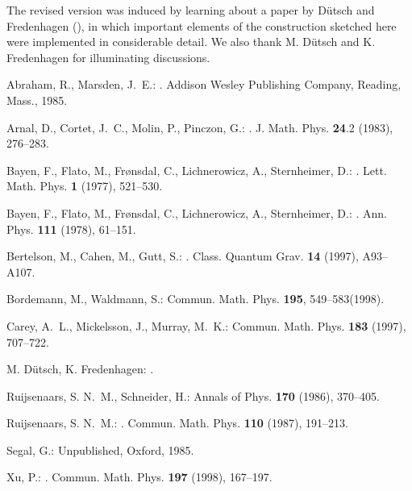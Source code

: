 \documentclass[a4paper,12pt]{article}
\begin{document}
The revised version was induced by learning about a paper by D\"utsch
and Fredenhagen (\cite{DF00}), in which important elements of 
the construction sketched here were
implemented in considerable detail. We also thank M. D\"utsch and 
K. Fredenhagen for
illuminating discussions.

\begin{thebibliography}{**}

{\sc Abraham, R., Marsden, J.~E.: }.
\newblock Addison Wesley Publishing Company, Reading, Mass., 1985.
 
{\sc Arnal, D., Cortet, J.~C., Molin, P., Pinczon, G.: }.
\newblock J. Math. Phys.  {\bf 24}.2 (1983), 276--283.
 
{\sc Bayen, F., Flato, M., Fr{{\o}}nsdal, C., Lichnerowicz, A., Sternheimer,
  D.: }.
\newblock Lett. Math. Phys.  {\bf 1} (1977), 521--530.

{\sc Bayen, F., Flato, M., Fr{{\o}}nsdal, C., Lichnerowicz, A., Sternheimer,
  D.: }.
\newblock Ann. Phys.  {\bf 111} (1978), 61--151.

{\sc Bertelson, M., Cahen, M., Gutt, S.: }.
\newblock Class. Quantum Grav.  {\bf 14} (1997), A93--A107.

{\sc Bordemann, M., Waldmann, S.: }
\newblock Commun. Math. Phys. {\bf 195}, 549--583(1998).
 
{\sc Carey, A.~L., Mickelsson, J., Murray, M.~K.: }
\newblock Commun. Math. Phys.  {\bf 183} (1997), 707--722.

  {\sc M. D\"utsch, K. Fredenhagen:}
  .
 
{\sc Ruijsenaars, S. N.~M., Schneider, H.: }
\newblock Annals of Phys.  {\bf 170} (1986), 370--405.
 
{\sc Ruijsenaars, S. N.~M.: }.
\newblock Commun. Math. Phys.  {\bf 110} (1987), 191--213.

{\sc Segal, G.: }
\newblock Unpublished, Oxford, 1985.
 
{\sc Xu, P.: }.
\newblock Commun. Math. Phys.  {\bf 197} (1998), 167--197.
 
\end{thebibliography}  
\end{document}
